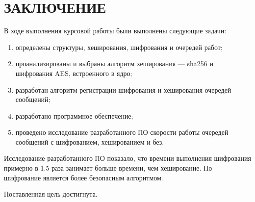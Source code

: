 \section*{\large ЗАКЛЮЧЕНИЕ}

В ходе выполнения курсовой работы были выполнены следующие задачи:
\begin{enumerate}
    \item определены структуры, хеширования, шифрования и очередей работ;
    \item проанализированы и выбраны алгоритм хеширования --- sha256 и шифрования AES, встроенного в ядро;
    \item разработан алгоритм регистрации шифрования и хеширования очередей сообщений;
    \item разработано программное обеспечение;
    \item проведено исследование разработанного ПО скорости работы очередей сообщений с шифрованием, хешированием и без.
\end{enumerate}


Исследование разработанного ПО показало, что времени выполнения шифрования примерно в 1.5 раза занимает больше времени, чем хеширование.
Но шифрование является более безопасным алгоритмом.

Поставленная цель достигнута.